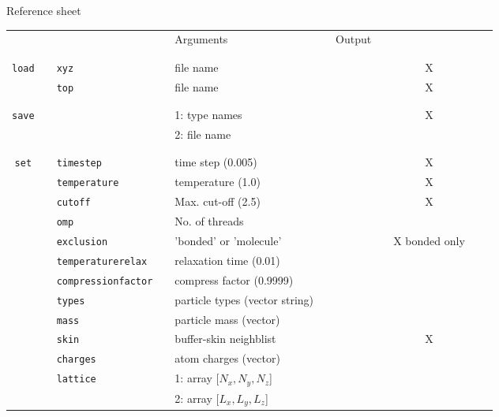 \documentclass[11pt]{article}
\begin{document}
\begin{center}

  {\huge{Reference sheet}}
  
  \bigskip

  \bigskip
  
  \begin{tabular}{cclclcccccc}
	  {\color{red}{\textbf{Action}}} && {\color{blue}{Specifier}} && Arguments && Output && \rotatebox{90}{CUDA}\\
		&& && && && && \\
    \hline
		&& && && && \\
	  \verb!load! && \verb!xyz! && file name &&  && X \\
	  $\mbox{}$ && \verb!top! && file name &&  && X \\
								   && && &&  && && \\
    \hline
	  && && && && && \\
	  \verb!save! &&  && 1: type names && && X \\
				&&  && 2: file name &&  && \\
				&& && && && \\
    \hline
	  && && && && \\
	  \verb!set! && \verb!timestep! && time step (0.005) && && X \\
	  $\mbox{}$  && \verb!temperature! && temperature (1.0) && && X\\
	  $\mbox{}$  && \verb!cutoff! && Max. cut-off (2.5) && && X \\
	  $\mbox{}$  && \verb!omp! && No. of threads && && \\
	  $\mbox{}$ && \verb!exclusion! && 'bonded' or 'molecule' && && X  bonded only\\
	  $\mbox{}$ && \verb!temperaturerelax! && relaxation time (0.01) && && \\
	  $\mbox{}$ && \verb!compressionfactor! && compress factor (0.9999) && && \\
	  $\mbox{}$ && \verb!types! && particle types (vector string) && && \\
	  $\mbox{}$ && \verb!mass! && particle mass (vector) && && \\
	  $\mbox{}$ && \verb!skin! && buffer-skin neighblist && && X \\
	  $\mbox{}$ && \verb!charges! && atom charges (vector) && && \\
	  $\mbox{}$ && \verb!lattice! && 1: array [$N_x , N_y , N_z$] && && \\
	  $\mbox{}$ && $\mbox{}$      && 2: array [$L_x, L_y, L_z$] && && \\

\end{tabular}
\end{center}
\end{document}

